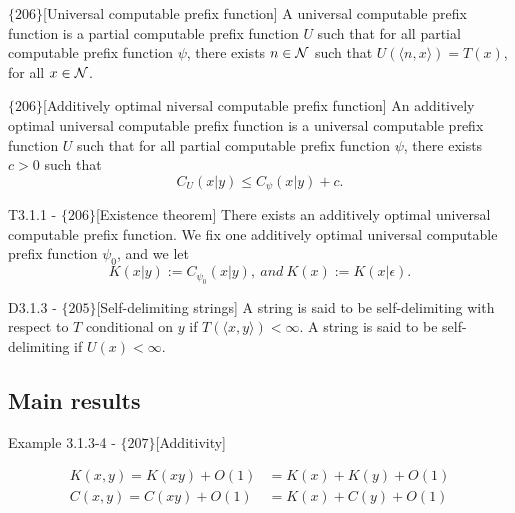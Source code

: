 \documentclass{article}
\begin{document}
\begin{flexidefinition}{$\{206\}$}[Universal computable prefix function]
    A universal computable prefix function is a partial computable prefix function $U$ such that for all partial computable prefix function $\psi$, there exists $n \in \mathcal{N}$ such that $U(\langle n, x \rangle) = T(x)$, for all $x \in \mathcal{N}$.
\end{flexidefinition}

\begin{flexidefinition}{$\{206\}$}[Additively optimal niversal computable prefix function]
    An additively optimal universal computable prefix function is a universal computable prefix function $U$ such that for all partial computable prefix function $\psi$, there exists $c > 0$ such that
    \begin{equation}
        C_{U}(x|y) \leq C_{\psi}(x|y) + c.
    \end{equation}
\end{flexidefinition}

\begin{flexitheorem}{T3.1.1 - $\{206\}$}[Existence theorem]
    There exists an additively optimal universal computable prefix function. We fix one additively optimal universal computable prefix function $\psi_0$, and we let 
    \begin{equation}
        K(x|y) := C_{\psi_0}(x|y), \ and \ K(x) := K(x|\epsilon).
    \end{equation}
    
\end{flexitheorem}

\begin{flexidefinition}{D3.1.3 - $\{ 205\}$}[Self-delimiting strings]
	A string is said to be self-delimiting with respect to $T$ conditional on $y$ if $T(\langle x, y \rangle) < \infty$. A string is said to be self-delimiting if $U(x) < \infty$.
\end{flexidefinition}

\subsection{Main results}

\begin{flexilemma}{Example 3.1.3-4 - $\{207\}$}[Additivity]

\begin{align}
	K(x,y) = K(xy) + O(1) &= K(x) + K(y) + O(1)\\
	C(x,y) = C(xy) + O(1) &= K(x) + C(y) + O(1)
\end{align}
	
\end{flexilemma}
\end{document}
